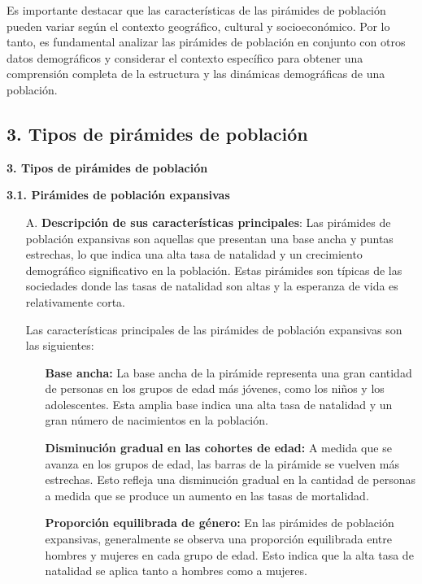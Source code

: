 \documentclass[8pt,a4paper]{beamer}
\begin{document}
{\begin{frame}{}
\justifying
\begin{block}{}
\justifying
Es importante destacar que las características de las pirámides de población pueden variar según el contexto geográfico, cultural y socioeconómico. Por lo tanto, es fundamental analizar las pirámides de población en conjunto con otros datos demográficos y considerar el contexto específico para obtener una comprensión completa de la estructura y las dinámicas demográficas de una población.
\end{block}
\end{frame}

\subsection{3. Tipos de pirámides de población}
\begin{frame}{\textbf{3. Tipos de pirámides de población}}
\begin{block}{\textbf{3.1. Pirámides de población expansivas}}
\justifying
\begin{enumerate}
\justifying
\item[A.] \textbf{Descripción de sus características principales}:  Las pirámides de población expansivas son aquellas que presentan una base ancha y puntas estrechas, lo que indica una alta tasa de natalidad y un crecimiento demográfico significativo en la población. Estas pirámides son típicas de las sociedades donde las tasas de natalidad son altas y la esperanza de vida es relativamente corta.

Las características principales de las pirámides de población expansivas son las siguientes:
\begin{itemize}
\justifying
\item[\ding{65}] \textbf{Base ancha:} La base ancha de la pirámide representa una gran cantidad de personas en los grupos de edad más jóvenes, como los niños y los adolescentes. Esta amplia base indica una alta tasa de natalidad y un gran número de nacimientos en la población.

\item[\ding{65}] \textbf{Disminución gradual en las cohortes de edad:} A medida que se avanza en los grupos de edad, las barras de la pirámide se vuelven más estrechas. Esto refleja una disminución gradual en la cantidad de personas a medida que se produce un aumento en las tasas de mortalidad.

\item[\ding{65}]  \textbf{Proporción equilibrada de género:} En las pirámides de población expansivas, generalmente se observa una proporción equilibrada entre hombres y mujeres en cada grupo de edad. Esto indica que la alta tasa de natalidad se aplica tanto a hombres como a mujeres.
\end{itemize}


\end{enumerate}
\end{block}
\end{frame}}
\end{document}
